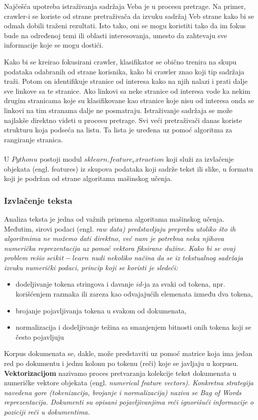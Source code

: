 \documentclass[a4paper]{article}
\begin{document}
Najčešća upotreba istraživanja sadržaja Veba je u procesu pretrage. Na primer, crawler-i se koriste od strane pretraživača da izvuku sadržaj Veb strane kako bi se odmah dobili traženi rezultati. Isto tako, oni se mogu koristiti tako da im fokus bude na određenoj temi ili oblasti interesovanja, umesto da zahtevaju sve informacije koje se mogu dostići.

Kako bi se kreirao fokusirani crawler, klasifikator se obično trenira na skupu podataka odabranih od strane korisnika, kako bi crawler znao koji tip sadržaja traži. Potom on identifikuje stranice od interesa kako na njih nalazi i prati dalje sve linkove sa te stranice. Ako linkovi sa neke stranice od interesa vode ka nekim drugim stranicama koje su klasifikovane kao stranice koje nisu od interesa onda se linkovi na tim stranama dalje ne posmatraju. Istraživanje sadržaja se može najlakše direktno videti u procesu pretrage. Svi veći pretraživači danas koriste strukturu koja podseća na listu. Ta lista je uređena uz pomoć algoritma za rangiranje stranica.\\\\

U $Pythonu$ postoji modul $sklearn.feature_extraction$ koji služi za izvlačenje objekata (engl. features) iz skupova podataka koji sadrže tekst ili slike, u formatu koji je podržan od strane algoritama mašinskog učenja. 

\subsubsection{Izvlačenje teksta}

Analiza teksta je jedna od važnih primena algoritama mašinskog učenja. Međutim, sirovi podaci (engl. \em{raw data}) predstavljaju prepreku utoliko što ih algoritmima ne možemo dati direktno, već nam je potrebna neka njihova numerička reprezentacija uz pomoć vektora fiksirane dužine. Kako bi se ovaj problem rešio $scikit-learn$ nudi nekoliko načina da se iz tekstualnog sadržaja izvuku numerički podaci, princip koji se koristi je sledeći:
\begin{itemize}
\item dodeljivanje tokena stringova i davanje $id$-ja za svaki od tokena, npr. korišćenjem razmaka ili zareza kao odvajajućih elemenata između dva tokena,
\item brojanje pojavljivanja tokena u svakom od dokumenata,
\item normalizacija i dodeljivanje težina sa smanjenjem bitnosti onih tokena koji se često pojavljuju
\end{itemize}
Korpus dokumenata se, dakle, može predstaviti uz pomoć matrice koja ima jedan red po dokumentu i jednu kolonu po tokenu (reči) koje se javljaju u korpusu.
\textbf{Vektorizacijom} nazivamo proces pretvaranja kolekcije tekst dokumenata u numeričke vektore objekata (engl. \em{numerical feature vectors}). Konkretna strategija navedena gore (tokenizacija, brojanje i normalizacija) naziva se \textit{Bag of Words} reprezentacija. Dokumenti su opisani pojavljivanjima reči ignorišući informacije o poziciji reči u dokumentima.\\\\
\end{document}
